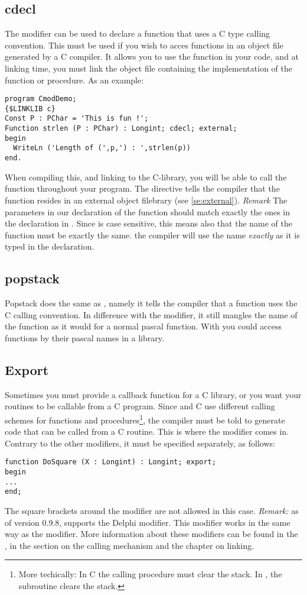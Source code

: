 \documentclass{report}
\begin{document}
\subsection{cdecl}
\label{se:cdecl}
The  modifier can be used to declare a function that uses a C
type calling convention. This must be used if you wish to acces functions in
an object file generated by a C compiler. It allows you to use the function in
your code, and at linking time, you must link the object file containing the
 implementation of the function or procedure.
As an example:
\begin{verbatim}
program CmodDemo;
{$LINKLIB c}
Const P : PChar = 'This is fun !';
Function strlen (P : PChar) : Longint; cdecl; external;
begin
  WriteLn ('Length of (',p,') : ',strlen(p))
end.
\end{verbatim}
When compiling this, and linking to the C-library, you will be able to call
the  function throughout your program. The 
directive tells the compiler that the function resides in an external
object filebrary (see \ref{se:external}).
{\em Remark} The parameters in our declaration of the  function should
match exactly the ones in the declaration in . Since  is case
sensitive, this means also that the name of the
function must be exactly the same. the \fpc compiler will use the name {\em
exactly} as it is typed in the declaration.
\subsection{popstack}
\label{se:popstack}
Popstack does the same as , namely it tells the \fpc compiler
that a function uses the C calling convention. In difference with the
 modifier, it still mangles the name of the function as it would
for a normal pascal function.
With  you could access functions by their pascal names in a
library.
\subsection{Export}
Sometimes you must provide a callback function for a C library, or you want
your routines to be callable from a C program. Since \fpc and C use
different calling schemes for functions and procedures\footnote{More
techically: In C the calling procedure must clear the stack. In \fpc, the
subroutine clears the stack.}, the compiler must be told to generate code
that can be called from a C routine. This is where the  modifier
comes in. Contrary to the other modifiers, it must be specified separately,
as follows:
\begin{verbatim}
function DoSquare (X : Longint) : Longint; export;
begin
...
end;
\end{verbatim}
The square brackets around the modifier are not allowed in this case.
{\em Remark:}
as of version 0.9.8, \fpc supports the Delphi  modifier.
This modifier works in the same way as the  modifier.
More information about these modifiers can be found in the \progref, in the
section on the calling mechanism and the chapter on linking.
\end{document}
